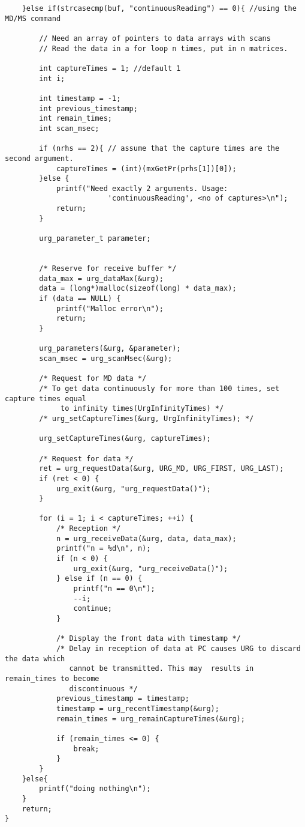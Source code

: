 \begin{lstlisting}
    }else if(strcasecmp(buf, "continuousReading") == 0){ //using the MD/MS command

    	// Need an array of pointers to data arrays with scans
    	// Read the data in a for loop n times, put in n matrices.

    	int captureTimes = 1; //default 1
    	int i;

		int timestamp = -1;
    	int previous_timestamp;
    	int remain_times;
		int scan_msec;

    	if (nrhs == 2){ // assume that the capture times are the second argument.
    		captureTimes = (int)(mxGetPr(prhs[1])[0]);
    	}else {
    		printf("Need exactly 2 arguments. Usage: 
                        'continuousReading', <no of captures>\n");
    		return;
    	}

    	urg_parameter_t parameter;


    	/* Reserve for receive buffer */
    	data_max = urg_dataMax(&urg);
    	data = (long*)malloc(sizeof(long) * data_max);
    	if (data == NULL) {
    		printf("Malloc error\n");
    		return;
    	}

    	urg_parameters(&urg, &parameter);
    	scan_msec = urg_scanMsec(&urg);

    	/* Request for MD data */
    	/* To get data continuously for more than 100 times, set capture times equal
    	     to infinity times(UrgInfinityTimes) */
    	/* urg_setCaptureTimes(&urg, UrgInfinityTimes); */

    	urg_setCaptureTimes(&urg, captureTimes);

    	/* Request for data */
    	ret = urg_requestData(&urg, URG_MD, URG_FIRST, URG_LAST);
    	if (ret < 0) {
    		urg_exit(&urg, "urg_requestData()");
    	}

    	for (i = 1; i < captureTimes; ++i) {
    		/* Reception */
    		n = urg_receiveData(&urg, data, data_max);
    		printf("n = %d\n", n);
    		if (n < 0) {
    			urg_exit(&urg, "urg_receiveData()");
    		} else if (n == 0) {
    			printf("n == 0\n");
    			--i;
    			continue;
    		}

    		/* Display the front data with timestamp */
    		/* Delay in reception of data at PC causes URG to discard the data which
    	       cannot be transmitted. This may  results in remain_times to become
    	       discontinuous */
    		previous_timestamp = timestamp;
    		timestamp = urg_recentTimestamp(&urg);
    		remain_times = urg_remainCaptureTimes(&urg);

    		if (remain_times <= 0) {
    			break;
    		}
    	}
    }else{
    	printf("doing nothing\n");
    }
    return;
}
\end{lstlisting}


